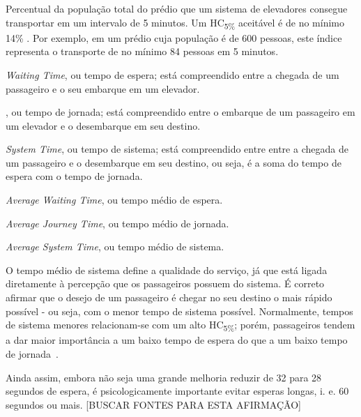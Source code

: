 \begin{description}[leftmargin=!,labelwidth=\widthof{\bfseries HC\textsubscript{5\%}}]
  \item[HC\textsubscript{5\%}]
  Percentual da população total do prédio que um sistema de elevadores consegue transportar em um intervalo de 5 minutos. Um HC\textsubscript{5\%} aceitável é de no mínimo 14\% \cite{KOEHLEROTTIGER02}. Por exemplo, em um prédio cuja população é de 600 pessoas, este índice representa o transporte de no mínimo 84 pessoas em 5 minutos.

  \item[WT]
  \textit{Waiting Time}, ou tempo de espera; está compreendido entre a chegada de um passageiro e o seu embarque em um elevador.

  \item[JT]
  , ou tempo de jornada; está compreendido entre o embarque de um passageiro em um elevador e o desembarque em seu destino.

  \item[ST]
  \textit{System Time}, ou tempo de sistema; está compreendido entre entre a chegada de um passageiro e o desembarque em seu destino, ou seja, é a soma do tempo de espera com o tempo de jornada.

  \item[AWT]
  \textit{Average Waiting Time}, ou tempo médio de espera.

  \item[AJT]
  \textit{Average Journey Time}, ou tempo médio de jornada.


  \item[AST]
  \textit{Average System Time}, ou tempo médio de sistema.
\end{description}

O tempo médio de sistema define a qualidade do serviço, já que está ligada diretamente à percepção que os passageiros possuem do sistema. É correto afirmar que o desejo de um passageiro é chegar no seu destino o mais rápido possível - ou seja, com o menor tempo de sistema possível. Normalmente, tempos de sistema menores relacionam-se com um alto HC\textsubscript{5\%}; porém, passageiros tendem a dar maior importância a um baixo tempo de espera do que a um baixo tempo de jornada~\cite{KOEHLEROTTIGER02}.

 Ainda assim, embora não seja uma grande melhoria reduzir de 32 para 28 segundos de espera, é psicologicamente importante evitar esperas longas, i. e. 60 segundos ou mais. {\color{red}[BUSCAR FONTES PARA ESTA AFIRMAÇÃO]} %


